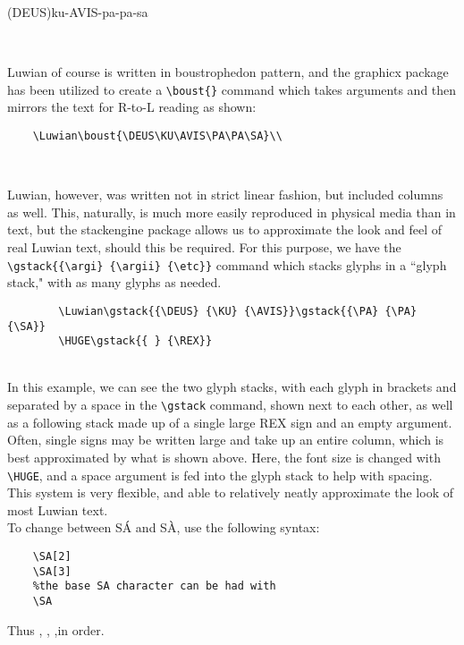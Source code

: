 \documentclass[12pt,A4]{article}
\begin{document}
\noindent(DEUS)ku-AVIS-pa-pa-sa

    \noindent\Luwian\DEUS\KU\AVIS\PA\PA\SA\\\Lat

Luwian of course is written in boustrophedon pattern, and the graphicx package has been utilized to create a \verb|\boust{}| command which takes arguments and then mirrors the text for R-to-L reading as shown:

\begin{verbatim}
    \Luwian\boust{\DEUS\KU\AVIS\PA\PA\SA}\\
\end{verbatim}
    \Luwian\boust{\DEUS\KU\AVIS\PA\PA\SA}\\\Lat

\newpage Luwian, however, was written not in strict linear fashion, but included columns as well. This, naturally, is much more easily reproduced in physical media than in text, but the stackengine package allows us to approximate the look and feel of real Luwian text, should this be required. For this purpose, we have the \verb|\gstack{{\argi} {\argii} {\etc}}| command which stacks glyphs in a ``glyph stack," with as many glyphs as needed.

    \begin{verbatim}
        \Luwian\gstack{{\DEUS} {\KU} {\AVIS}}\gstack{{\PA} {\PA} {\SA}}
        \HUGE\gstack{{ } {\REX}}
    \end{verbatim}
    \Luwian\gstack{{\DEUS} {\KU} {\AVIS}}\gstack{{\PA} {\PA} {\SA}}\HUGE\gstack{{ } {\REX}}\Lat\\

In this example, we can see the two glyph stacks, with each glyph in brackets and separated by a space in the \verb|\gstack| command, shown next to each other, as well as a following stack made up of a single large REX sign and an empty argument. Often, single signs may be written large and take up an entire column, which is best approximated by what is shown above. Here, the font size is changed with \verb|\HUGE|, and a space argument is fed into the glyph stack to help with spacing. This system is very flexible, and able to relatively neatly approximate the look of most Luwian text.\\

To change between S\'A and S\`A, use the following syntax:
\begin{verbatim}
    \SA[2]
    \SA[3]
    %the base SA character can be had with
    \SA
\end{verbatim}
Thus \Luwian\SA[2], \SA[3], \SA,\setmainfont{Charis SIL}\normalsize in order.
\end{document}
